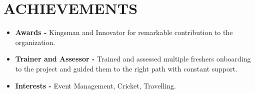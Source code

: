 \documentclass[letterpaper,11pt]{article}
\begin{document}
\section{ACHIEVEMENTS}
 \begin{itemize}
    \item \textbf{Awards -} {Kingsman and Innovator for remarkable contribution to the organization.} \vspace{2pt} \\
    \item \textbf{Trainer and Assessor -} {Trained and assessed multiple freshers onboarding to the project and guided them to the right path with constant support.} \vspace{2pt} \\
    \item \textbf{Interests -} {Event Management, Cricket, Travelling.} \vspace{2pt} \\
 \end{itemize}
\end{document}
